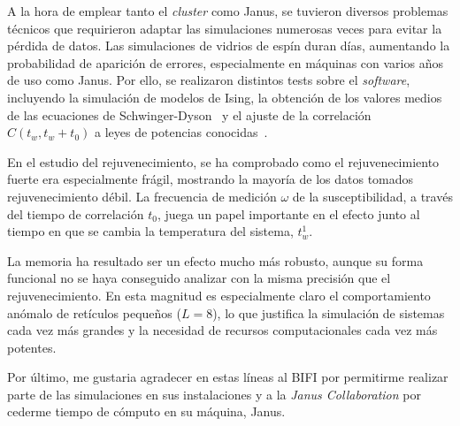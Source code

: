 \documentclass[11pt]{report}
\begin{document}
A la hora de emplear tanto el \textit{cluster} como Janus, se tuvieron
diversos problemas técnicos que requirieron adaptar las simulaciones
numerosas veces para evitar la pérdida de datos. Las simulaciones de
vidrios de espín duran días, aumentando la probabilidad de aparición
de errores, especialmente en máquinas con varios años de uso como
Janus. Por ello, se realizaron distintos tests sobre el \textit{software},
incluyendo la simulación de modelos de Ising, la obtención de los
valores medios de las ecuaciones de Schwinger-Dyson~\cite{schwinger} y
el ajuste de la correlación $C(t_w,t_w+t_0)$ a leyes de potencias
conocidas~\cite{corrparisi}.

En el estudio del rejuvenecimiento, se ha comprobado como el
rejuvenecimiento fuerte era especialmente frágil, mostrando la mayoría
de los datos tomados rejuvenecimiento débil. La frecuencia de medición
$ω$ de la susceptibilidad, a través del tiempo de correlación $t_0$,
juega un papel importante en el efecto junto al tiempo en que se
cambia la temperatura del sistema, $t_w^1$.

La memoria ha resultado ser un efecto mucho más robusto, aunque su
forma funcional no se haya conseguido analizar con la misma precisión
que el rejuvenecimiento. En esta magnitud es especialmente claro el
comportamiento anómalo de retículos pequeños ($L=8$), lo que justifica
la simulación de sistemas cada vez más grandes y la necesidad de
recursos computacionales cada vez más potentes.

Por último, me gustaria agradecer en estas líneas al BIFI por
permitirme realizar parte de las simulaciones en sus instalaciones y a
la \textit{Janus Collaboration} por cederme tiempo de cómputo en su
máquina, Janus.
\end{document}
